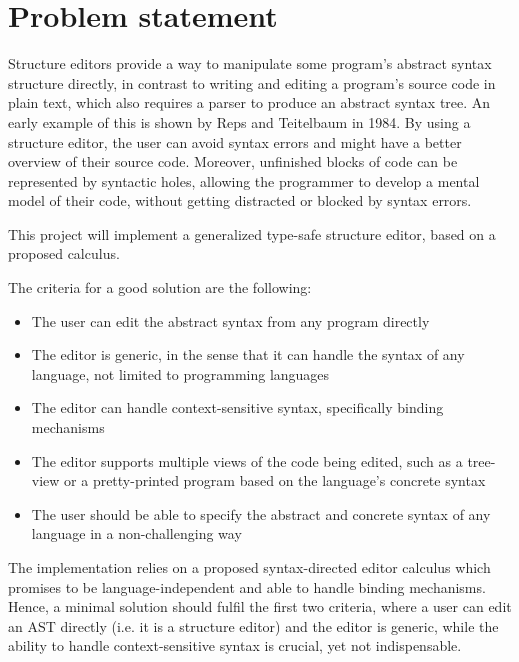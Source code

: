\section{Problem statement}
Structure editors provide a way to manipulate some program's abstract syntax structure directly, in contrast to writing and editing a program's source code in plain text, which also requires a parser to produce an abstract syntax tree. An early example of this is shown by Reps and Teitelbaum\cite{timtom84} in 1984.
By using a structure editor, the user can avoid syntax errors and might have a better overview of their source code. Moreover, unfinished blocks of code can be represented by syntactic holes, allowing the programmer to develop a mental model of their code, without getting distracted or blocked by syntax errors.

This project will implement a generalized type-safe structure editor, based on a proposed calculus\cite{aalborg}.

The criteria for a good solution are the following:

\begin{itemize}
    \item The user can edit the abstract syntax from any program directly
    \item The editor is generic, in the sense that it can handle the syntax of any language, not limited to programming languages
    \item The editor can handle context-sensitive syntax, specifically binding mechanisms
    \item The editor supports multiple views of the code being edited, such as a tree-view or a pretty-printed program based on the language's concrete syntax
    \item The user should be able to specify the abstract and concrete syntax of any language in a non-challenging way
\end{itemize}

The implementation relies on a proposed syntax-directed editor calculus\cite{aalborg} which promises to be language-independent and able to handle binding mechanisms. Hence, a minimal solution should fulfil the first two criteria, where a user can edit an AST directly (i.e. it is a structure editor) and the editor is generic, while the ability to handle context-sensitive syntax is crucial, yet not indispensable.

